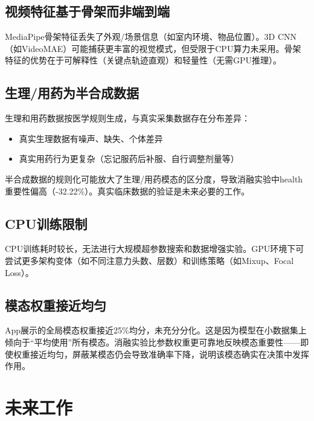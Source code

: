 \subsection{视频特征基于骨架而非端到端}

MediaPipe骨架特征丢失了外观/场景信息（如室内环境、物品位置）。3D CNN（如VideoMAE）可能捕获更丰富的视觉模式，但受限于CPU算力未采用。骨架特征的优势在于可解释性（关键点轨迹直观）和轻量性（无需GPU推理）。

\subsection{生理/用药为半合成数据}

生理和用药数据按医学规则生成，与真实采集数据存在分布差异：

\begin{itemize}
    \item 真实生理数据有噪声、缺失、个体差异
    \item 真实用药行为更复杂（忘记服药后补服、自行调整剂量等）
\end{itemize}

半合成数据的规则化可能放大了生理/用药模态的区分度，导致消融实验中health重要性偏高（-32.22\%）。真实临床数据的验证是未来必要的工作。

\subsection{CPU训练限制}

CPU训练耗时较长，无法进行大规模超参数搜索和数据增强实验。GPU环境下可尝试更多架构变体（如不同注意力头数、层数）和训练策略（如Mixup、Focal Loss）。

\subsection{模态权重接近均匀}

App展示的全局模态权重接近25\%均分，未充分分化。这是因为模型在小数据集上倾向于``平均使用''所有模态。消融实验比参数权重更可靠地反映模态重要性——即使权重接近均匀，屏蔽某模态仍会导致准确率下降，说明该模态确实在决策中发挥作用。

\section{未来工作}

